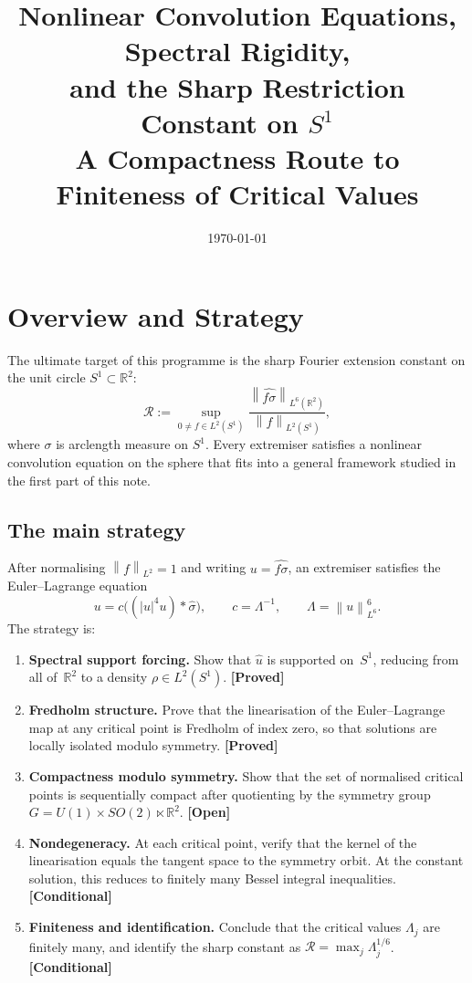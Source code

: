 \documentclass[12pt]{article}
\title{\textbf{Nonlinear Convolution Equations, Spectral Rigidity,\\
and the Sharp Restriction Constant on $S^1$}\\[0.5em]
\large A Compactness Route to Finiteness of Critical Values}
\author{}
\date{\today}
\theoremstyle{definition}
\theoremstyle{remark}
\newcommand{\R}{\mathbb{R}}
\newcommand{\wh}{\widehat}
\newcommand{\norm}[1]{\left\|#1\right\|}
\newcommand{\proven}{\textbf{\color{teal}[Proved]}}
\newcommand{\conditional}{\textbf{\color{orange}[Conditional]}}
\newcommand{\open}{\textbf{\color{red}[Open]}}
\begin{document}
\maketitle
\tableofcontents
\bigskip

\section{Overview and Strategy}

The ultimate target of this programme is the sharp Fourier extension
constant on the unit circle $S^1\subset\R^2$:
\[
  \mathcal R
  :=
  \sup_{0\neq f\in L^2(S^1)}
  \frac{\norm{\wh{f\sigma}}_{L^6(\R^2)}}{\norm{f}_{L^2(S^1)}},
\]
where $\sigma$ is arclength measure on $S^1$.  Every extremiser satisfies a
nonlinear convolution equation on the sphere that fits into a general
framework studied in the first part of this note.

\subsection{The main strategy}

After normalising $\norm{f}_{L^2}=1$ and writing $u=\wh{f\sigma}$, an
extremiser satisfies the Euler--Lagrange equation
\[
  u = c\bigl((|u|^4u)\ast\wh\sigma\bigr),
  \qquad c=\Lambda^{-1},\qquad \Lambda=\norm{u}_{L^6}^6.
\]
The strategy is:
\begin{enumerate}[leftmargin=2em]
  \item \textbf{Spectral support forcing.}  Show that $\wh u$ is supported
    on~$S^1$, reducing from all of~$\R^2$ to a density
    $\rho\in L^2(S^1)$.  \proven
  \item \textbf{Fredholm structure.}  Prove that the linearisation of the
    Euler--Lagrange map at any critical point is Fredholm of index zero,
    so that solutions are locally isolated modulo symmetry.  \proven
  \item \textbf{Compactness modulo symmetry.}  Show that the set of normalised
    critical points is sequentially compact after quotienting by the symmetry
    group $G=U(1)\times SO(2)\ltimes\R^2$.  \open
  \item \textbf{Nondegeneracy.}  At each critical point, verify that the kernel
    of the linearisation equals the tangent space to the symmetry orbit.
    At the constant solution, this reduces to finitely many Bessel integral
    inequalities.  \conditional
  \item \textbf{Finiteness and identification.}  Conclude that the critical
    values $\Lambda_j$ are finitely many, and identify the sharp constant as
    $\mathcal R = \max_j \Lambda_j^{1/6}$.  \conditional
\end{enumerate}
\end{document}
